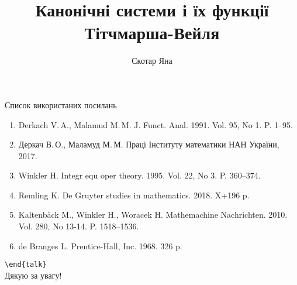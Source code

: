 \documentclass[
	10pt,
	hyperref = {unicode,pdfpagelabels=false},
	notheorems,
	aspectratio=169
	]{beamer}
\title{Канонічні системи і їх функції Тітчмарша-Вейля}
\author{Скотар Яна}
\institute
{Кафедра прикладної математики\\ Донецький національний університет імені Василя Стуса}
\date[20.12.2019]{}
\begin{document}
\maketitle






\begin{frame}{Список використаних посилань}
	\begin{enumerate}
		\item Derkach V.\,A., Malamud M.\,M. J. Funct. Anal. 1991. Vol. 95, No 1. P. 1--95.
		\item Деркач В.\,О., Маламуд М.\,М. Праці Інституту математики НАН України, 2017. 
		\item Winkler H. Integr equ oper theory. 1995. Vol. 22, No 3. P. 360--374.
		\item Remling K. De Gruyter studies in mathematics. 2018. X+196 p.
		\item Kaltenbäck M., Winkler H., Woracek H. Mathemachine Nachrichten. 2010. Vol. 280, No 13-14. P. 1518--1536.
		\item de Branges L. Prentice-Hall, Inc. 1968. 326 p.
	\end{enumerate}
\end{frame}

\begin{frame}[standout]
\texttt{{\textbackslash}end\{talk\}}\\[1em]
Дякую за увагу!
\end{frame}
\end{document}
